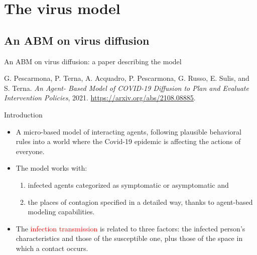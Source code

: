 \documentclass[9pt]{beamer}
\begin{document}
\section{The virus model}

\subsection{An ABM on virus diffusion}

\begin{frame}{An ABM on virus diffusion: a paper describing the model}

G. Pescarmona, P. Terna, A. Acquadro, P. Pescarmona, G. Russo, E. Sulis, and S. Terna. \emph{An Agent- Based Model of COVID-19 Diffusion to Plan and Evaluate Intervention Policies}, 2021. \url{https://arxiv.org/abs/2108.08885}.


\end{frame}


\begin{frame}{Introduction}

\begin{itemize}

\item
A micro-based model of interacting agents, following plausible behavioral rules into a world where the Covid-19 epidemic is affecting the actions of everyone. 
\item
The model works with: 

\begin{enumerate}[i]
\item infected agents categorized as symptomatic or asymptomatic and 
\item the places of contagion specified in a detailed way, thanks to agent-based modeling capabilities. 
\end{enumerate}

 \item
The \textcolor{red}{infection transmission} is related to three factors: the infected person's characteristics and those of the susceptible one, plus those of the space in which a contact occurs.

\end{itemize}
\end{frame}
\end{document}
